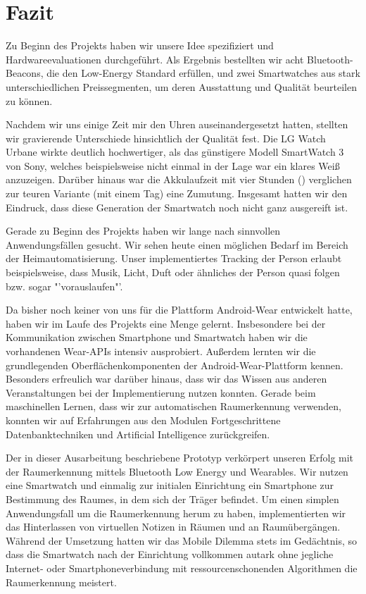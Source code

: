 \section{Fazit}
Zu Beginn des Projekts haben wir unsere Idee spezifiziert und Hardwareevaluationen durchgeführt. Als Ergebnis bestellten wir acht Bluetooth-Beacons, die den Low-Energy Standard erfüllen, und zwei Smartwatches aus stark unterschiedlichen Preissegmenten, um deren Ausstattung und Qualität beurteilen zu können.

Nachdem wir uns einige Zeit mir den Uhren auseinandergesetzt hatten, stellten wir gravierende Unterschiede hinsichtlich der Qualität fest. Die LG Watch Urbane wirkte deutlich hochwertiger, als das günstigere Modell SmartWatch 3 von Sony, welches beispielsweise nicht einmal in der Lage war ein klares Weiß anzuzeigen. Darüber hinaus war die Akkulaufzeit mit vier Stunden () verglichen zur teuren Variante (mit einem Tag) eine Zumutung. Insgesamt hatten wir den Eindruck, dass diese Generation der Smartwatch noch nicht ganz ausgereift ist. 

Gerade zu Beginn des Projekts haben wir lange nach sinnvollen Anwendungsfällen gesucht. Wir sehen heute einen möglichen Bedarf im Bereich der Heimautomatisierung. Unser implementiertes Tracking der Person erlaubt beispielsweise, dass Musik, Licht, Duft oder ähnliches der Person quasi folgen bzw. sogar "'vorauslaufen"'.

Da bisher noch keiner von uns für die Plattform Android-Wear entwickelt hatte, haben wir im Laufe des Projekts eine Menge gelernt. Insbesondere bei der Kommunikation zwischen Smartphone und Smartwatch haben wir die vorhandenen Wear-APIs intensiv ausprobiert. Außerdem lernten wir die grundlegenden Oberflächenkomponenten der Android-Wear-Plattform kennen. Besonders erfreulich war darüber hinaus, dass wir das Wissen aus anderen Veranstaltungen bei der Implementierung nutzen konnten. Gerade beim maschinellen Lernen, dass wir zur automatischen Raumerkennung verwenden, konnten wir auf Erfahrungen aus den Modulen Fortgeschrittene Datenbanktechniken und Artificial Intelligence zurückgreifen.

Der in dieser Ausarbeitung beschriebene Prototyp verkörpert unseren Erfolg mit der Raumerkennung mittels Bluetooth Low Energy und Wearables. Wir nutzen eine Smartwatch und einmalig zur initialen Einrichtung ein Smartphone zur Bestimmung des Raumes, in dem sich der Träger befindet. Um einen simplen Anwendungsfall um die Raumerkennung herum zu haben, implementierten wir das Hinterlassen von virtuellen Notizen in Räumen und an Raumübergängen. Während der Umsetzung hatten wir das Mobile Dilemma stets im Gedächtnis, so dass die Smartwatch nach der Einrichtung vollkommen autark ohne jegliche Internet- oder Smartphoneverbindung mit ressourcenschonenden Algorithmen die Raumerkennung meistert.

